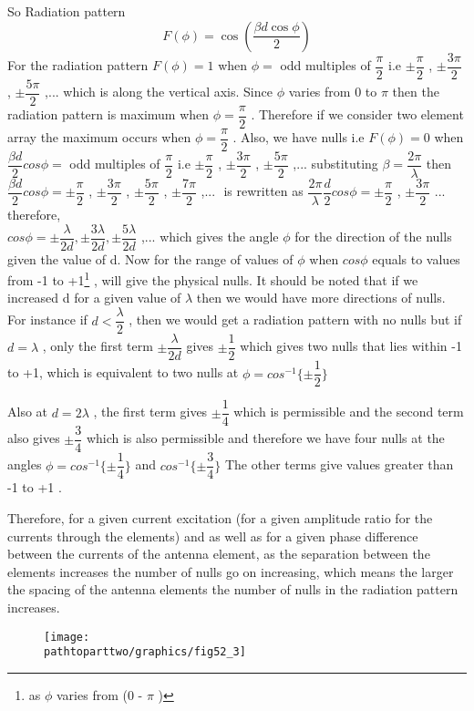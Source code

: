 So Radiation pattern
$$F(\phi) = \cos\left(\frac{\beta d\cos\phi}{2}\right)$$
For the radiation pattern $ F(\phi) = 1 $ when $\phi = $ odd multiples of $ \dfrac{\pi}{2} $ i.e $ \pm \dfrac{\pi}{2} $ , $ \pm \dfrac{3\pi}{2} $ , $ \pm \dfrac{5\pi}{2} $ ,... which is along the vertical axis. Since $ \phi $ varies from 0 to $ \pi $ then the radiation pattern is maximum when $ \phi = \dfrac{\pi}{2} $ . Therefore if we consider two element array the maximum occurs when $ \phi = \dfrac{\pi}{2} $ . Also, we have nulls i.e $ F(\phi) = 0 $ when $ \dfrac{\beta d}{2} cos\phi = $ odd multiples of $ \dfrac{\pi}{2} $  i.e  $ \pm \dfrac{\pi}{2} $ , $ \pm \dfrac{3\pi}{2} $ , $ \pm \dfrac{5\pi}{2} $ ,... substituting $ \beta = \dfrac{2\pi}{\lambda} $ then $ \dfrac{\beta d}{2} cos\phi = \pm \dfrac{\pi}{2} $ , $ \pm \dfrac{3\pi}{2} $ , $ \pm \dfrac{5\pi}{2} $ , $ \pm \dfrac{7\pi}{2} $ ,... $ $ is rewritten as $ \dfrac{2\pi}{\lambda} \dfrac{d}{2} cos \phi = \pm \dfrac{\pi}{2} $ , $ \pm \dfrac{3\pi}{2} $ ... therefore,
\\ $ cos \phi = \pm \dfrac{\lambda}{2d} , \pm \dfrac{3\lambda}{2d} , \pm \dfrac{5\lambda}{2d} $ ,... which gives the angle $ \phi $ for the direction of the nulls given the value of d. Now for the range of values of $ \phi $ when $ cos\phi $ equals to values from -1 to +1\footnote{as $ \phi $ varies from (0 - $ \pi $ )} , will give the physical nulls. It should be noted that if we increased d for a given value of $ \lambda $ then we would have more directions of nulls. For instance if $ d < \dfrac{\lambda}{2} $ , then we would get a radiation pattern with no nulls but if $ d = \lambda $ , only the first term $ \pm \dfrac{\lambda}{2d} $ gives $ \pm \dfrac{1}{2} $ which gives two nulls that lies within -1 to +1, which is equivalent to two nulls  at $ \phi = cos^{-1} \{\pm \dfrac{1}{2} \}  $  

Also at $ d = 2 \lambda $ , the first term gives $ \pm \dfrac{1}{4} $ which is permissible and the second term also gives  $ \pm \dfrac{3}{4} $ which is also permissible  and therefore we have four nulls at the angles $ \phi = cos^{-1} \{\pm \dfrac{1}{4} \}  $ and $ cos^{-1} \{\pm \dfrac{3}{4} \}  $ 
The other terms give values greater than -1 to +1 .

Therefore, for a given current excitation (for a given amplitude ratio for the currents through the elements) and as well as for a given phase difference between the currents of the antenna element, as the separation between the elements increases the number of nulls go on increasing, which means the larger the spacing of the antenna elements the number of nulls in the radiation pattern increases.
\begin{figure}[h]
\centering
\texttt{[image: \\pathtoparttwo/graphics/fig52\_3]}
\caption{}
\label{52.3}
\end{figure}

